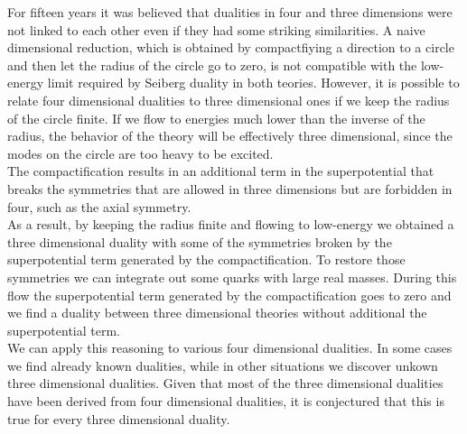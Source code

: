 For fifteen years it was believed that dualities in four and three dimensions were not linked to each other even if they had some striking similarities. 
A naive dimensional reduction, which is obtained by compactfiying a direction to a circle and then let the radius of the circle go to zero, is not compatible with the low-energy limit required by Seiberg duality in both teories.  
However, it is possible to relate four dimensional dualities to three dimensional ones if we keep the radius of the circle finite. 
If we flow to energies much lower than the inverse of the radius, the behavior of the theory will be effectively three dimensional, since the modes on the circle are too heavy to be excited.\\
The compactification results in an additional term in the superpotential that breaks the symmetries that are allowed in three dimensions but are forbidden in four, such as the axial symmetry.\\
As a result, by keeping the radius finite and flowing to low-energy we obtained a three dimensional duality with some of the symmetries broken by the superpotential term generated by the compactification. 
To restore those symmetries we can integrate out some quarks with large real masses. During this flow the superpotential term generated by the compactification goes to zero and we find a duality between three dimensional theories without additional the superpotential term.\\
We can apply this reasoning to various four dimensional dualities. 
In some cases we find already known dualities, while in other situations we discover unkown three dimensional dualities. 
Given that most of the three dimensional dualities have been derived from four dimensional dualities, it is conjectured that this is true for every three dimensional duality.\\

